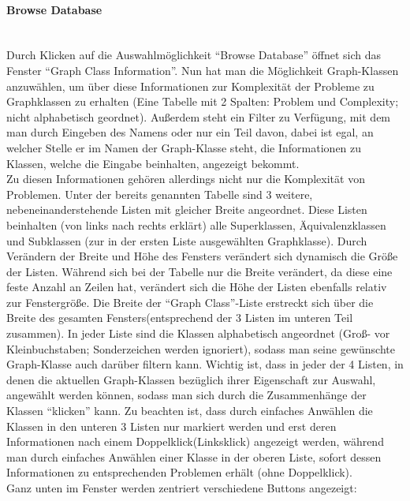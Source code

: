 \documentclass[10pt,a4paper]{article}
\begin{document}
\paragraph{Browse Database}\ \\
Durch Klicken auf die Auswahlmöglichkeit "`Browse Database"' öffnet sich das Fenster "`Graph Class Information"'. Nun hat man die Möglichkeit Graph-Klassen anzuwählen, um über diese Informationen zur Komplexität der Probleme zu Graphklassen zu erhalten (Eine Tabelle mit 2 Spalten: Problem und Complexity; nicht alphabetisch geordnet). Außerdem steht ein Filter zu Verfügung, mit dem man durch Eingeben des Namens oder nur ein Teil davon, dabei ist egal, an welcher Stelle er im Namen der Graph-Klasse steht, die Informationen zu Klassen, welche die Eingabe beinhalten, angezeigt bekommt.\\
Zu diesen Informationen gehören allerdings nicht nur die Komplexität von Problemen. Unter der bereits genannten Tabelle sind 3 weitere, nebeneinanderstehende Listen mit gleicher Breite angeordnet. Diese Listen beinhalten (von links nach rechts erklärt) alle Superklassen, Äquivalenzklassen und Subklassen (zur in der ersten Liste ausgewählten Graphklasse). Durch Verändern der Breite und Höhe des Fensters verändert sich dynamisch die Größe der Listen. Während sich bei der Tabelle nur die Breite verändert, da diese eine feste Anzahl an Zeilen hat, verändert sich die Höhe der Listen ebenfalls relativ zur Fenstergröße. Die Breite der "`Graph Class"'-Liste erstreckt sich über die Breite des gesamten Fensters(entsprechend der 3 Listen im unteren Teil zusammen). In jeder Liste sind die Klassen alphabetisch angeordnet (Groß- vor Kleinbuchstaben; Sonderzeichen werden ignoriert), sodass man seine gewünschte Graph-Klasse auch darüber filtern kann. Wichtig ist, dass in jeder der 4 Listen, in denen die aktuellen Graph-Klassen bezüglich ihrer Eigenschaft zur Auswahl, angewählt werden können, sodass man sich durch die Zusammenhänge der Klassen "`klicken"' kann. Zu beachten ist, dass durch einfaches Anwählen die Klassen in den unteren 3 Listen nur markiert werden und erst deren Informationen nach einem Doppelklick(Linksklick) angezeigt werden, während man durch einfaches Anwählen einer Klasse in der oberen Liste, sofort dessen Informationen zu entsprechenden Problemen erhält (ohne Doppelklick).\\
Ganz unten im Fenster werden zentriert verschiedene Buttons angezeigt:
\end{document}
